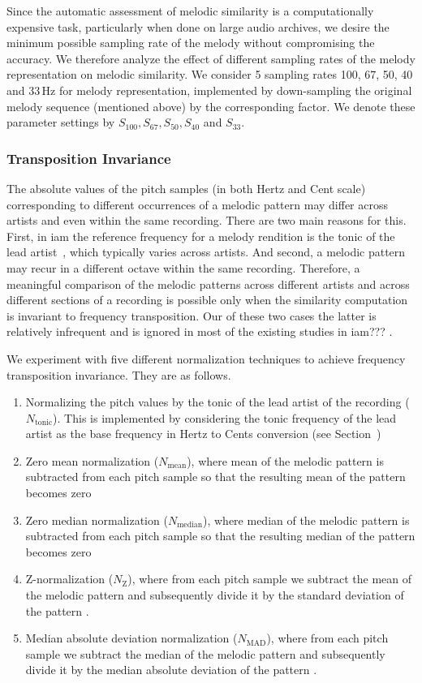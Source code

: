 Since the automatic assessment of melodic similarity is a computationally expensive task, particularly when done on large audio archives, we desire the minimum possible sampling rate of the melody without compromising the accuracy. We therefore analyze the effect of different sampling rates of the melody representation on melodic similarity. We consider 5 sampling rates 100, 67, 50, 40 and 33\,Hz for melody representation, implemented by down-sampling the original melody sequence (mentioned above) by the corresponding factor. We denote these parameter settings by $S_{100}, S_{67}, S_{50}, S_{40}$ and $S_{33}$.

\subsubsection{Transposition Invariance}
\label{sec:patterns_melodic_similarity_transposition_invariance}

The absolute values of the pitch samples (in both Hertz and Cent scale) corresponding to different occurrences of a melodic pattern may differ across artists and even within the same recording. There are two main reasons for this. First, in \gls{iam} the reference frequency for a melody rendition is the tonic of the lead artist~\citep{Gulati2014Tonic}, which typically varies across artists. And second, a melodic pattern may recur in a different octave within the same recording. Therefore, a meaningful comparison of the melodic patterns across different artists and across different sections of a recording is possible only when the similarity computation is invariant to frequency transposition. Our of these two cases the latter is relatively infrequent and is ignored in most of the existing studies in \gls{iam}??? .

We experiment with five different normalization techniques to achieve frequency transposition invariance. They are as follows. 
\begin{enumerate}
	\item Normalizing the pitch values by the tonic of the lead artist of the recording ($N_{\mathrm{tonic}}$). This is implemented by considering the tonic frequency of the lead artist as the base frequency in Hertz to Cents conversion (see Section~)
	\item Zero mean normalization ($N_{\mathrm{mean}}$), where mean of the melodic pattern is subtracted from each pitch sample so that the resulting mean of the pattern becomes zero
	\item Zero median normalization ($N_{\mathrm{median}}$), where median of the melodic pattern is subtracted from each pitch sample so that the resulting median of the pattern becomes zero
	\item Z-normalization ($N_{\mathrm{Z}}$), where from each pitch sample we subtract the mean of the melodic pattern and subsequently divide it by the standard deviation of the pattern .
	\item Median absolute deviation normalization ($N_{\mathrm{MAD}}$), where from each pitch sample we subtract the median of the melodic pattern and subsequently divide it by the median absolute deviation of the pattern .
\end{enumerate}

